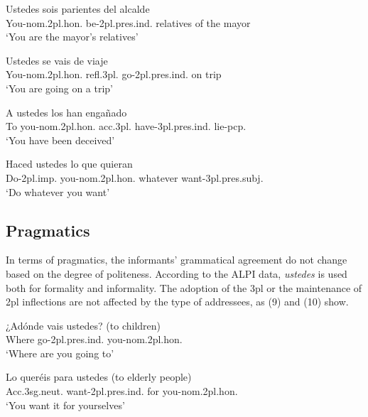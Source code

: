 \documentclass[output=paper]{LSP/langsci}
\begin{document}
\ea
\gll Ustedes                   sois                      parientes del     alcalde\\
You-nom.2pl.hon. be-2pl.pres.ind. relatives of the mayor\\
\glt   ‘You are the mayor’s relatives’\\
\z

\ea
\gll Ustedes                    se            vais                      de viaje\\
You-nom.2pl.hon. refl.3pl. go-2pl.pres.ind. on trip\\
\glt   ‘You are going on a trip’\\
\z

\ea
\gll A  ustedes                    los          han                          engañado\\
To you-nom.2pl.hon. acc.3pl. have-3pl.pres.ind. lie-pcp.\\
\glt   ‘You have been deceived’\\
\z

\ea
\gll Haced           ustedes                  lo que      quieran\\ 
Do-2pl.imp. you-nom.2pl.hon. whatever want-3pl.pres.subj.\\
\glt   ‘Do whatever you want’\\
\z

\subsection{Pragmatics}
In terms of pragmatics, the informants’ grammatical agreement do not change based on the degree of politeness. According to the ALPI data, \textit{ustedes} is used both for formality and informality. The adoption of the 3pl or the maintenance of 2pl inflections are not affected by the type of addressees, as (9) and (10) show.

\ea
\gll ¿Adónde vais                      ustedes? (to children)\\
Where     go-2pl.pres.ind. you-nom.2pl.hon.\\
\glt   ‘Where are you going to’\\
\z

\ea
\gll Lo                     queréis                      para ustedes (to elderly people)\\
Acc.3sg.neut. want-2pl.pres.ind. for    you-nom.2pl.hon.\\
\glt   ‘You want it for yourselves’\\
\z
\end{document}
